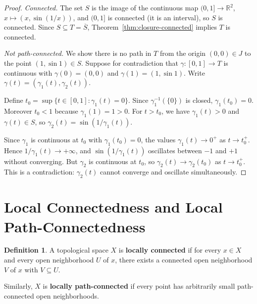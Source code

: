 \documentclass[11pt,a4paper,twoside]{book}
\theoremstyle{remark}
\theoremstyle{definition}
\theoremstyle{definition}
\newtheorem{definition}{Definition}[section]
\begin{document}
\begin{proof}
\emph{Connected.}\;
The set $S$ is the image of the continuous map
$(0,1]\to\mathbb{R}^2$, $x\mapsto(x,\sin(1/x))$, and $(0,1]$
is connected (it is an interval), so $S$ is connected.  Since
$S\subseteq T=\overline{S}$, Theorem~\ref{thm:closure-connected}
implies $T$ is connected.

\medskip\noindent
\emph{Not path-connected.}\;
We show there is no path in $T$ from the origin $(0,0)\in J$ to
the point $(1,\sin 1)\in S$.  Suppose for contradiction that
$\gamma\colon[0,1]\to T$ is continuous with $\gamma(0)=(0,0)$
and $\gamma(1)=(1,\sin 1)$.  Write $\gamma(t)=(\gamma_1(t),\gamma_2(t))$.

Define $t_0=\sup\{t\in[0,1]:\gamma_1(t)=0\}$.  Since
$\gamma_1^{-1}(\{0\})$ is closed, $\gamma_1(t_0)=0$.  Moreover
$t_0<1$ because $\gamma_1(1)=1>0$.  For $t>t_0$, we have
$\gamma_1(t)>0$ and $\gamma(t)\in S$, so
$\gamma_2(t)=\sin(1/\gamma_1(t))$.

Since $\gamma_1$ is continuous at $t_0$ with $\gamma_1(t_0)=0$,
the values $\gamma_1(t)\to 0^+$ as $t\to t_0^+$.  Hence
$1/\gamma_1(t)\to+\infty$, and $\sin(1/\gamma_1(t))$ oscillates
between $-1$ and $+1$ without converging.  But $\gamma_2$ is
continuous at $t_0$, so $\gamma_2(t)\to\gamma_2(t_0)$ as
$t\to t_0^+$.  This is a contradiction: $\gamma_2(t)$ cannot
converge and oscillate simultaneously.
\end{proof}


\section{Local Connectedness and Local Path-Connectedness}
\label{sec:local-connectedness}

\begin{definition}\label{def:locally-connected}
A topological space $X$ is \textbf{locally connected}%
 if for every $x\in X$ and every open
neighborhood $U$ of $x$, there exists a connected open neighborhood
$V$ of $x$ with $V\subseteq U$.

Similarly, $X$ is \textbf{locally path-connected}%
 if every point has arbitrarily small
path-connected open neighborhoods.
\end{definition}
\end{document}
